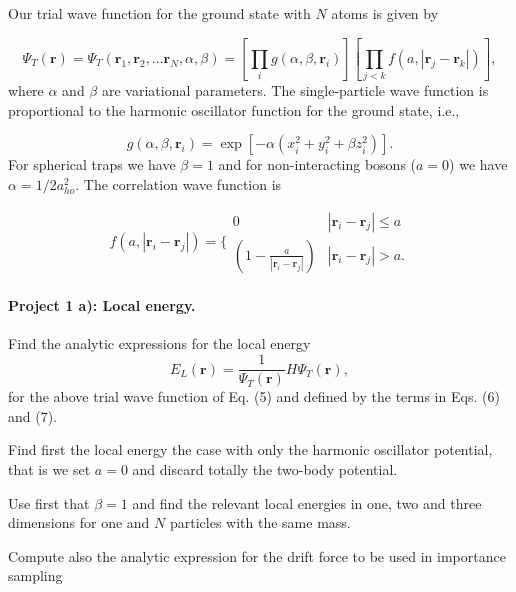 \documentclass[%
oneside,                 %
final,                   %
10pt]{article}
\begin{document}
 Our trial wave function for the ground state with $N$ atoms is given by

\begin{equation}
 \Psi_T(\mathbf{r})=\Psi_T(\mathbf{r}_1, \mathbf{r}_2, \dots \mathbf{r}_N,\alpha,\beta)
 =\left[
    \prod_i g(\alpha,\beta,\mathbf{r}_i)
 \right]
 \left[
    \prod_{j<k}f(a,|\mathbf{r}_j-\mathbf{r}_k|)
 \right],
 \label{eq:trialwf}
 \end{equation}
 where $\alpha$ and $\beta$ are variational parameters. The
 single-particle wave function is proportional to the harmonic
 oscillator function for the ground state, i.e.,

\begin{equation}
    g(\alpha,\beta,\mathbf{r}_i)= \exp{[-\alpha(x_i^2+y_i^2+\beta z_i^2)]}.
 \end{equation}
 For spherical traps we have $\beta = 1$ and for non-interacting
 bosons ($a=0$) we have $\alpha = 1/2a_{ho}^2$.  The correlation wave
 function is

\begin{equation}
    f(a,|\mathbf{r}_i-\mathbf{r}_j|)=\Bigg\{
 \begin{array}{ll}
	 0 & {|\mathbf{r}_i-\mathbf{r}_j|} \leq {a}\\
	 (1-\frac{a}{|\mathbf{r}_i-\mathbf{r}_j|}) & {|\mathbf{r}_i-\mathbf{r}_j|} > {a}.
 \end{array}
 \end{equation}


\paragraph{Project 1 a): Local energy.}
Find the analytic expressions for the local energy
\begin{equation}
    E_L(\mathbf{r})=\frac{1}{\Psi_T(\mathbf{r})}H\Psi_T(\mathbf{r}),
    \label{eq:locale}
 \end{equation}
 for the above 
 trial wave function of Eq. (5) and defined by the terms in Eqs. (6) and (7). 

Find first the local energy the case with only the harmonic oscillator potential, that is we set $a=0$ and discard totally the two-body potential.

Use first that $\beta =1$ and find the relevant local energies in one, two and three dimensions for one and
$N$ particles with the same mass. 

 Compute also the analytic expression for the drift force to be used in importance sampling
\end{document}
